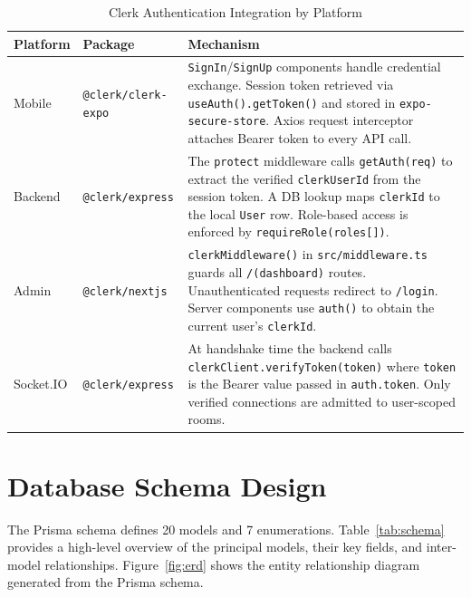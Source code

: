 \documentclass[12pt,a4paper]{report}
\begin{document}
\begin{table}[H]
\caption{Clerk Authentication Integration by Platform}
\label{tab:clerk_auth}
\centering
\small
{}
\begin{tabularx}{\textwidth}{|l|l|X|}
\hline
\textbf{Platform} & \textbf{Package} & \textbf{Mechanism} \\
\hline
Mobile & \texttt{@clerk/clerk-expo} & \texttt{SignIn}/\texttt{SignUp} components handle
credential exchange. Session token retrieved via \texttt{useAuth().getToken()} and stored
in \texttt{expo-secure-store}. Axios request interceptor attaches Bearer token to every
API call. \\
\hline
Backend & \texttt{@clerk/express} & The \texttt{protect} middleware calls
\texttt{getAuth(req)} to extract the verified \texttt{clerkUserId} from the session token.
A DB lookup maps \texttt{clerkId} to the local \texttt{User} row. Role-based access is
enforced by \texttt{requireRole(roles[])}. \\
\hline
Admin & \texttt{@clerk/nextjs} & \texttt{clerkMiddleware()} in
\texttt{src/middleware.ts} guards all \texttt{/(dashboard)} routes. Unauthenticated
requests redirect to \texttt{/login}. Server components use \texttt{auth()} to obtain
the current user's \texttt{clerkId}. \\
\hline
Socket.IO & \texttt{@clerk/express} & At handshake time the backend calls
\texttt{clerkClient.verifyToken(token)} where \texttt{token} is the Bearer value passed
in \texttt{auth.token}. Only verified connections are admitted to user-scoped rooms. \\
\hline
\end{tabularx}
\end{table}

\section{Database Schema Design}

The Prisma schema defines 20 models and 7 enumerations. Table~\ref{tab:schema} provides
a high-level overview of the principal models, their key fields, and inter-model
relationships. Figure~\ref{fig:erd} shows the entity relationship diagram generated from
the Prisma schema.
\end{document}
